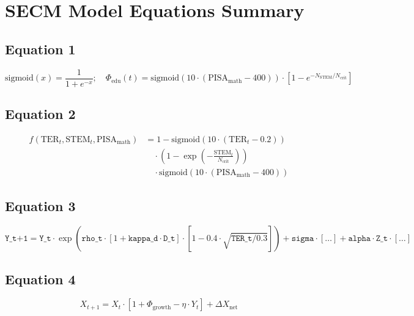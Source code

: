 \documentclass[12pt]{article}
\begin{document}
\section*{SECM Model Equations Summary}
\subsection*{Equation 1}
\begin{equation}
\text{sigmoid}(x) = \frac{1}{1 + e^{-x}};
\quad
\Phi_{\text{edu}}(t) = \text{sigmoid}(10 \cdot (\text{PISA}_{\text{math}} - 400)) \cdot \left[1 - e^{-N_{\text{STEM}} / N_{\text{crit}}} \right]
\end{equation}

\subsection*{Equation 2}
\begin{equation}
\begin{aligned}
f(\text{TER}_t, \text{STEM}_t, \text{PISA}_{\text{math}}) 
&= 1 - \text{sigmoid}(10 \cdot (\text{TER}_t - 0.2)) \\
&\quad \cdot \left(1 - \exp\left(-\frac{\text{STEM}_t}{N_{\text{crit}}} \right)\right) \\
&\quad \cdot \text{sigmoid}(10 \cdot (\text{PISA}_{\text{math}} - 400))
\end{aligned}
\label{eq:EducationFilter}
\end{equation}

\subsection*{Equation 3}
\begin{equation}
\texttt{Y\_t+1} = \texttt{Y\_t} \cdot \exp\left( \texttt{rho\_t} \cdot \left[1 + \texttt{kappa\_d} \cdot \texttt{D\_t} \right] \cdot \left[1 - 0.4 \cdot \sqrt{ \texttt{TER\_t} / 0.3 } \right] \right) + \texttt{sigma} \cdot [\ldots] + \texttt{alpha} \cdot \texttt{Z\_t} \cdot [\ldots]
\end{equation}

\subsection*{Equation 4}
\begin{equation}
X_{t+1} = X_t \cdot \left[1 + \Phi_{\text{growth}} - \eta \cdot Y_t \right] + \Delta X_{\text{net}}
\end{equation}
\end{document}
